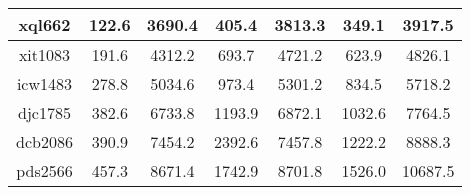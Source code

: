 \documentclass{article}
\begin{document}
\begin{table}[h!]
\begin{tabular}{|c|c|c|c|c|c|c|}
        \hline
        xql662 & 122.6 & 3690.4 & 405.4 & 3813.3 & 349.1 & 3917.5 \\
        \hline
        xit1083 & 191.6 & 4312.2 & 693.7 & 4721.2 & 623.9 & 4826.1 \\
        \hline
        icw1483 & 278.8 & 5034.6 & 973.4 & 5301.2 & 834.5 & 5718.2 \\
        \hline
        djc1785 & 382.6 & 6733.8 & 1193.9 & 6872.1 & 1032.6 & 7764.5 \\
        \hline
        dcb2086 & 390.9 & 7454.2 & 2392.6 & 7457.8 & 1222.2 & 8888.3 \\
        \hline
        pds2566 & 457.3 & 8671.4 & 1742.9 & 8701.8 & 1526.0 & 10687.5 \\
        \hline
    \end{tabular}
\end{table}
\end{document}
